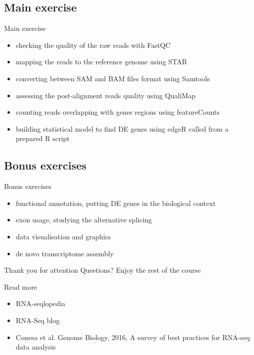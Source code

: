\documentclass{beamer}\usepackage[]{graphicx}\usepackage[]{color}
\begin{document}
\subsection{Main exercise}
\begin{frame}
\begin{block}{Main exercise}
\begin{itemize}
\item checking the quality of the raw reads with FastQC
\item mapping the reads to the reference genome using STAR
\item converting between SAM and BAM files format using Samtools
\item assessing the post-alignment reads quality using QualiMap
\item counting reads overlapping with genes regions using featureCounts
\item building statistical model to find DE genes using edgeR called from a prepared R script
\end{itemize}
\end{block}
\end{frame}

\subsection{Bonus exercises}
\begin{frame}
\begin{block}{Bonus exercises}
\begin{itemize}
\item functional annotation, putting DE genes in the biological context
\item exon usage, studying the alternative splicing
\item data visualisation and graphics
\item de novo transcriptome assembly
\end{itemize}
\end{block}
\end{frame}
  

\begin{frame}
\begin{center}
\huge
Thank you for attention \newline
\vspace{1cm}
Questions? \newline
\vspace{1cm}
Enjoy the rest of the course
\end{center}

\begin{block}{Read more}
\begin{itemize}
  \item RNA-seqlopedia
  \item RNA-Seq blog
  \item Conesa et al. Genome Biology, 2016, A survey of best practices for RNA-seq data analysis
\end{itemize}
\end{block}
\end{frame}
\end{document}
